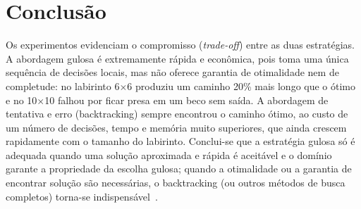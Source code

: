 \documentclass[12pt, a4paper, brazil]{article}
\begin{document}
\section{Conclusão}
Os experimentos evidenciam o compromisso (\textit{trade-off}) entre as duas estratégias. A abordagem gulosa é extremamente rápida e econômica, pois toma uma única sequência de decisões locais, mas não oferece garantia de otimalidade nem de completude: no labirinto 6$\times$6 produziu um caminho 20\% mais longo que o ótimo e no 10$\times$10 falhou por ficar presa em um beco sem saída. A abordagem de tentativa e erro (backtracking) sempre encontrou o caminho ótimo, ao custo de um número de decisões, tempo e memória muito superiores, que ainda crescem rapidamente com o tamanho do labirinto. Conclui-se que a estratégia gulosa só é adequada quando uma solução aproximada e rápida é aceitável e o domínio garante a propriedade da escolha gulosa; quando a otimalidade ou a garantia de encontrar solução são necessárias, o backtracking (ou outros métodos de busca completos) torna-se indispensável~\cite{cormen2009, sedgewick2011}.




\end{document}
